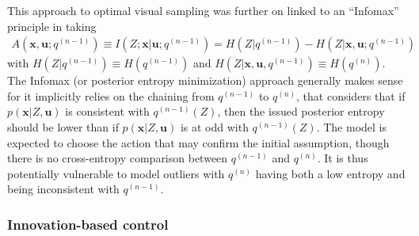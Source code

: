 \documentclass[12pt,twoside,openright]{article}
\begin{document}


This approach to optimal visual sampling was further on linked to an ``Infomax'' principle in \cite{butko2010infomax} 
taking
\begin{align}A(\boldsymbol{x}, \boldsymbol{u}; q^{(n-1)}) \equiv I(Z; \boldsymbol{x}|\boldsymbol{u}; q^{(n-1)})
= H(Z|q^{(n-1)}) - H(Z|\boldsymbol{x}, \boldsymbol{u}; q^{(n-1)})
\label{eq:infomax}
\end{align}
with  $H(Z|q^{(n-1)}) \equiv H(q^{(n-1)})$ and $H(Z|\boldsymbol{x}, \boldsymbol{u}, q^{(n-1)}) \equiv H(q^{(n)})$.
The Infomax (or posterior entropy minimization) approach generally makes sense for it implicitly relies on the chaining from $q^{(n-1)}$ to $q^{(n)}$, that considers that if $p(\boldsymbol{x}|Z, \boldsymbol{u})$ is consistent with $q^{(n-1)}(Z)$, then the issued posterior entropy should be lower than if $p(\boldsymbol{x}|Z, \boldsymbol{u})$ is at odd with $q^{(n-1)}(Z)$. The model is expected to choose the action that may confirm the initial assumption, though there is no cross-entropy comparison between $q^{(n-1)}$ and $q^{(n)}$.
It is thus potentially vulnerable to model outliers with $q^{(n)}$ having both a low entropy and being inconsistent with $q^{(n-1)}$.





\subsubsection{Innovation-based control}\label{sec:saliency}

\end{document}
